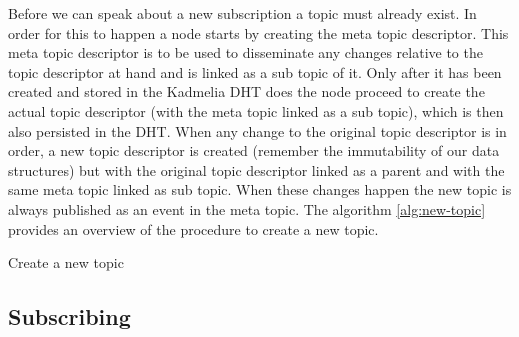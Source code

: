 Before we can speak about a new subscription a topic must already exist. In
order for this to happen a node starts by creating the meta topic descriptor.
This meta topic descriptor is to be used to disseminate any changes relative to
the topic descriptor at hand and is linked as a sub topic of it. Only after it
has been created and stored in the Kadmelia DHT does the node proceed to create
the actual topic descriptor (with the meta topic linked as a sub topic), which
is then also persisted in the DHT. When any change to the original topic
descriptor is in order, a new topic descriptor is created (remember the
immutability of our data structures) but with the original topic descriptor
linked as a parent and with the same meta topic linked as sub topic. When these
changes happen the new topic is always published as an event in the meta topic.
The algorithm \ref{alg:new-topic} provides an overview of the procedure to
create a new topic.


\vspace{8pt}
\begin{algorithm}[H]
  \SetAlgoLined
  \caption{Create a new topic}
	\label{alg:new-topic}
\end{algorithm}
\vspace{8pt}

\subsection{Subscribing}\label{subsec:subscribing}

